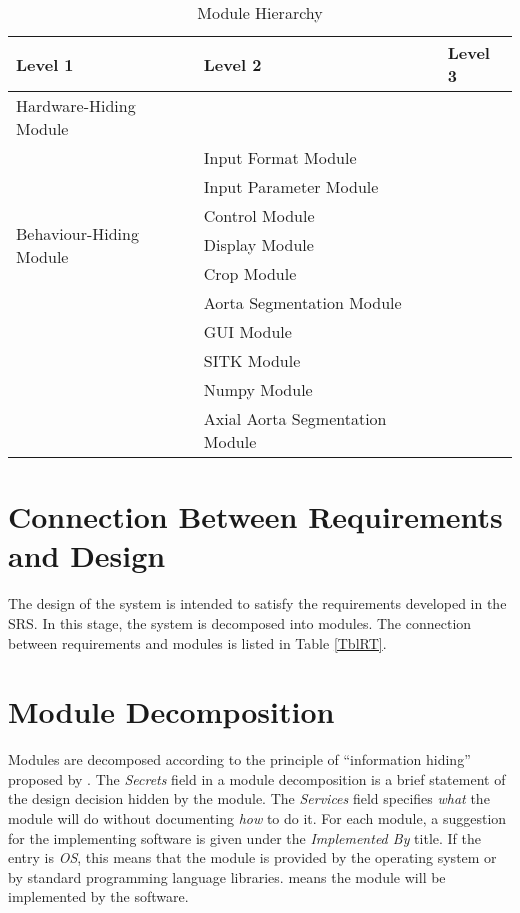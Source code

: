 \documentclass[12pt, titlepage]{article}
\begin{document}
\begin{table}[h!]
\centering
\begin{tabular}{p{} p{}p{}}
\toprule
\textbf{Level 1} & \textbf{Level 2} & \textbf{Level 3}\\
\midrule

{Hardware-Hiding Module} & ~ \\
\midrule

\multirow{7}{0.3\textwidth}{Behaviour-Hiding Module} 
&  Input Format Module & \\
&  Input Parameter Module & \\
& Control Module  & \\
& Display Module  & \\
& Crop Module & \\
& Aorta Segmentation Module & \\
\midrule

\multirow{3}{0.3\textwidth}{Software Decision Module}
& GUI Module & \\
& SITK Module \\
& Numpy Module\\
& Axial Aorta Segmentation Module\\
\bottomrule

\end{tabular}
\caption{Module Hierarchy}
\label{TblMH}
\end{table}

\section{Connection Between Requirements and Design} \label{SecConnection}

The design of the system is intended to satisfy the requirements developed in
the SRS. In this stage, the system is decomposed into modules. The connection
between requirements and modules is listed in Table \ref{TblRT}.

\section{Module Decomposition} \label{SecMD}

Modules are decomposed according to the principle of ``information hiding''
proposed by \citet{ParnasEtAl1984}. The \emph{Secrets} field in a module
decomposition is a brief statement of the design decision hidden by the
module. The \emph{Services} field specifies \emph{what} the module will do
without documenting \emph{how} to do it. For each module, a suggestion for the
implementing software is given under the \emph{Implemented By} title. If the
entry is \emph{OS}, this means that the module is provided by the operating
system or by standard programming language libraries.  \emph{\progname{}} means the
module will be implemented by the \progname{} software.
\end{document}
